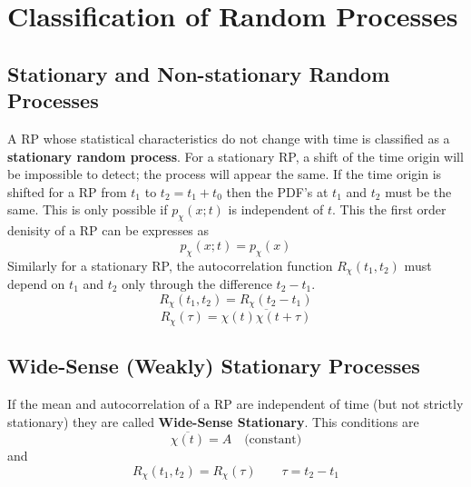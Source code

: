 \documentclass{article}
\begin{document}
    \section{Classification of Random Processes}
    \subsection{Stationary and Non-stationary Random Processes}
    A RP whose statistical characteristics do not change with time is classified as a \textbf{stationary random process}.
    For a stationary RP, a shift of the time origin will be impossible to detect; the process will appear the same. If the
    time origin is shifted for a RP from $t_1$ to $t_2 = t_1 + t_0$ then the PDF's at $t_1$ and $t_2$ must be the same.
    This is only possible if $p_\chi(x; t)$ is independent of $t$. This the first order denisity of a RP can be expresses as
    \begin{equation}
        p_{\chi}(x; t) = p_{\chi}(x)
    \end{equation}
    Similarly for a stationary RP, the autocorrelation function $R_\chi(t_1, t_2)$ must depend on $t_1$ and $t_2$ only through 
    the difference $t_2 - t_1$. 
    \begin{equation}
        R_\chi(t_1, t_2) = R_\chi(t_2-t_1)
    \end{equation}
    \begin{equation}
        R_\chi(\tau) = \overline{\chi(t)\chi(t + \tau)}
    \end{equation}

    \subsection{Wide-Sense (Weakly) Stationary Processes}
    If the mean and autocorrelation of a RP are independent of time (but not strictly stationary) they are called \textbf{
    Wide-Sense Stationary}. This conditions are 
    \begin{equation}
        \overline{\chi(t)} = A \quad \textrm{(constant)}
    \end{equation}
    and 
    \begin{equation}
        R_\chi(t_1, t_2) = R_\chi(\tau) \quad\quad \tau = t_2 - t_1
    \end{equation}
\end{document}
